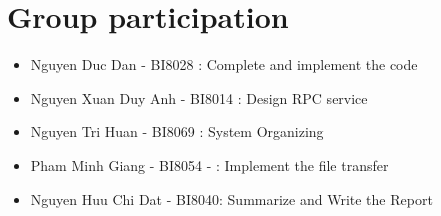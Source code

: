 \documentclass[12pt]{article}
\begin{document}
	
	\section{Group participation}
	\begin{itemize}
		\item Nguyen Duc Dan - BI8028 : Complete and implement the code
		\item Nguyen Xuan Duy Anh - BI8014 : Design RPC service
		\item Nguyen Tri Huan - BI8069 : System Organizing
		\item Pham Minh Giang - BI8054 - :  Implement the file transfer
		\item Nguyen Huu Chi Dat - BI8040: Summarize and 
		Write the Report
	\end{itemize}
\end{document}
